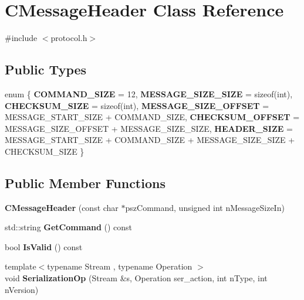 \hypertarget{class_c_message_header}{}\section{C\+Message\+Header Class Reference}
\label{class_c_message_header}


{\ttfamily \#include $<$protocol.\+h$>$}

\subsection*{Public Types}
\begin{DoxyCompactItemize}
\item 
\mbox{\label{class_c_message_header_a813026098ad76f6127ae051aa77828ad}} 
enum \{ \newline
{\bfseries C\+O\+M\+M\+A\+N\+D\+\_\+\+S\+I\+ZE} = 12, 
{\bfseries M\+E\+S\+S\+A\+G\+E\+\_\+\+S\+I\+Z\+E\+\_\+\+S\+I\+ZE} = sizeof(int), 
{\bfseries C\+H\+E\+C\+K\+S\+U\+M\+\_\+\+S\+I\+ZE} = sizeof(int), 
{\bfseries M\+E\+S\+S\+A\+G\+E\+\_\+\+S\+I\+Z\+E\+\_\+\+O\+F\+F\+S\+ET} = M\+E\+S\+S\+A\+G\+E\+\_\+\+S\+T\+A\+R\+T\+\_\+\+S\+I\+ZE + C\+O\+M\+M\+A\+N\+D\+\_\+\+S\+I\+ZE, 
\newline
{\bfseries C\+H\+E\+C\+K\+S\+U\+M\+\_\+\+O\+F\+F\+S\+ET} = M\+E\+S\+S\+A\+G\+E\+\_\+\+S\+I\+Z\+E\+\_\+\+O\+F\+F\+S\+ET + M\+E\+S\+S\+A\+G\+E\+\_\+\+S\+I\+Z\+E\+\_\+\+S\+I\+ZE, 
{\bfseries H\+E\+A\+D\+E\+R\+\_\+\+S\+I\+ZE} = M\+E\+S\+S\+A\+G\+E\+\_\+\+S\+T\+A\+R\+T\+\_\+\+S\+I\+ZE + C\+O\+M\+M\+A\+N\+D\+\_\+\+S\+I\+ZE + M\+E\+S\+S\+A\+G\+E\+\_\+\+S\+I\+Z\+E\+\_\+\+S\+I\+ZE + C\+H\+E\+C\+K\+S\+U\+M\+\_\+\+S\+I\+ZE
 \}
\end{DoxyCompactItemize}
\subsection*{Public Member Functions}
\begin{DoxyCompactItemize}
\item 
\mbox{\label{class_c_message_header_a4e68c30f9e7e485c13157a27c4ebff8c}} 
{\bfseries C\+Message\+Header} (const char $\ast$psz\+Command, unsigned int n\+Message\+Size\+In)
\item 
\mbox{\label{class_c_message_header_ab5b3807481d4b918527b86523f1efee2}} 
std\+::string {\bfseries Get\+Command} () const
\item 
\mbox{\label{class_c_message_header_a45221ad4c5e867c80d4ca33eb8918f36}} 
bool {\bfseries Is\+Valid} () const
\item 
\mbox{\label{class_c_message_header_a3881923a93297c3a7a8e413ab3730408}} 
{\footnotesize template$<$typename Stream , typename Operation $>$ }\\void {\bfseries Serialization\+Op} (Stream \&s, Operation ser\+\_\+action, int n\+Type, int n\+Version)
\end{DoxyCompactItemize}
